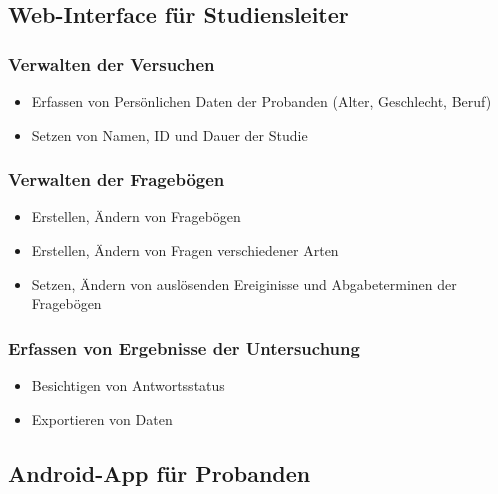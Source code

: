 \documentclass[a4paper]{scrreprt}
\begin{document}
            \subsection{\gls{Web-Interface} für \gls{Studiensleiter}}

                \subsubsection{Verwalten der Versuchen}
                    \begin{itemize}
                        \item Erfassen von Pers\"onlichen Daten der Probanden (Alter, Geschlecht, Beruf)
                        \item Setzen von Namen, ID und Dauer der Studie
                    \end{itemize}

                \subsubsection{Verwalten der Frageb\"ogen}
                    \begin{itemize}
                        \item Erstellen, Ändern von Fragebögen
                        \item Erstellen, \"Andern von Fragen verschiedener Arten
                        \item Setzen, \"Andern von auslösenden Ereiginisse und Abgabeterminen der Frageb\"ogen
                    \end{itemize}

                \subsubsection{Erfassen von Ergebnisse der Untersuchung}
                    \begin{itemize}
                        \item Besichtigen von \gls{Antwortsstatus}
                        \item Exportieren von Daten
                    \end{itemize}
            \vspace*{0.5cm}

            \subsection{\gls{Android-App} f\"ur \gls{Proband}en}
\end{document}
